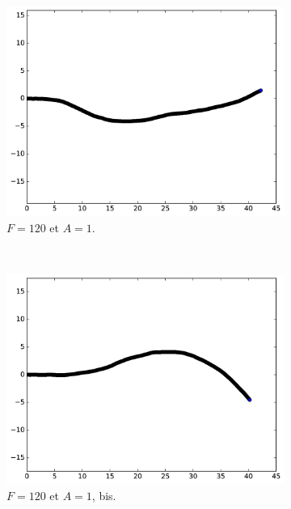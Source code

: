 	\begin{figure}[!htb]
		\begin{subfigure}[t]{0.49\textwidth}
			\centering
			\includegraphics[width=\textwidth]{figures/ch3/ac_2_19_1_120a}
			\caption[Mouvement pseudo-autocorrélé A]{$F = 120$ et $A = 1$.}
			\label{fig:ac1_120A}
		\end{subfigure}
		~
		\begin{subfigure}[t]{0.49\textwidth}
			\centering
			\includegraphics[width=\textwidth]{figures/ch3/ac_2_19_1_120b}
			\caption[Mouvement pseudo-autocorrélé B]{$F = 120$ et $A = 1$, bis.}
			\label{fig:ac_1_120B}
		\end{subfigure}
		~
		\begin{subfigure}[t]{0.49\textwidth}

\end{subfigure}
\end{figure}
